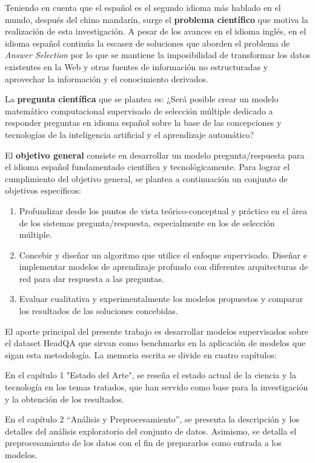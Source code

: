 Teniendo en cuenta que el español es el segundo idioma más hablado en el mundo, después del chino mandarín, surge el \textbf{problema científico} que motiva la realización de esta investigación. A pesar de los avances en el idioma inglés, en el idioma español continúa la escasez de soluciones que aborden el problema de \textit{Answer Selection} por lo que se mantiene la imposibilidad de transformar los datos existentes en la Web y otras fuentes de información no estructuradas y aprovechar la información y el conocimiento derivados.

La \textbf{pregunta científica} que se plantea es: ¿Será posible crear un modelo matemático computacional supervisado de selección múltiple dedicado a responder preguntas en idioma español sobre la base de las concepciones y tecnologías de la inteligencia artificial y el aprendizaje automático?

El \textbf{objetivo general} consiste en desarrollar un modelo pregunta/respuesta para el idioma español fundamentado científica y tecnológicamente. Para lograr el cumplimiento del objetivo general, se plantea a continuación un conjunto de objetivos específicos:

\begin{enumerate}
    \item Profundizar desde los puntos de vista teórico-conceptual y práctico en el área de los sistemas pregunta/respuesta, especialmente en los de selección múltiple. 
    \item Concebir y diseñar un algoritmo que utilice el enfoque supervisado. Diseñar e implementar modelos de aprendizaje profundo con diferentes arquitecturas de red para dar respuesta a las preguntas.
    \item Evaluar cualitativa y experimentalmente los modelos propuestos y comparar los resultados de las soluciones concebidas.
\end{enumerate}


El aporte principal del presente trabajo es desarrollar modelos supervisados sobre el dataset HeadQA que sirvan como benchmarks en la aplicación de modelos que sigan esta metodología. La memoria escrita se divide en cuatro capítulos:

En el capítulo 1 "Estado del Arte", se reseña el estado actual de la ciencia y la tecnología en los temas tratados, que han servido como base para la investigación y la obtención de los resultados.

En el capítulo 2 “Análisis y Preprocesamiento”, se presenta la descripción y los detalles del análisis exploratorio del conjunto de datos. Asimismo, se detalla el preprocesamiento de los datos con el fin de prepararlos como entrada a los modelos. 

